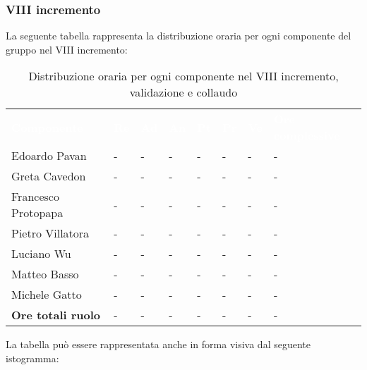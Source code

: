 \subsubsection{VIII incremento}
La seguente tabella rappresenta la distribuzione oraria per ogni componente del gruppo nel VIII incremento:
\begin{table}[!htbp]
\begin{center}
\renewcommand{\arraystretch}{1.25}
\begin{tabular}{ m{}<{\centering}  m{}<{\centering} m{}<{\centering} m{}<{\centering}  m{}<{\centering}  m{}<{\centering}  m{}<{\centering}  m{}<{\centering}   }
	\rowcolor{darkblue}
	\textcolor{white}{\textbf{Componente}} &\textcolor{white}{\textbf{Re}}&\textcolor{white}{\textbf{Ad}}&\textcolor{white}{\textbf{An}}&\textcolor{white}{\textbf{Pt}}&\textcolor{white}{\textbf{Pr}}&\textcolor{white}{\textbf{Ve}}&\textcolor{white}{\textbf{Ore complessive}}\\ 

	Edoardo Pavan & - & - & - & - & - & - & -\\	

	\rowcolor{gray!10} Greta Cavedon & - & - & - & - & - & - & -\\
	
	Francesco Protopapa & - & - & - & - & - & - & -\\
	
	\rowcolor{gray!10} Pietro Villatora & - & - & - & - & - & - & -\\
	
	Luciano Wu & - & - & - & - & - & - & -\\
	
	\rowcolor{gray!10} Matteo Basso & - & - & - & - & - & - & -\\
	
	Michele Gatto & - & - & - & - & - & - & -\\
	
	\rowcolor{gray!10} \textbf{Ore totali ruolo} & - & - & - & - & - & - & -\\

\end{tabular}
\caption{Distribuzione oraria per ogni componente nel VIII incremento,  validazione e collaudo}
\end{center}
\end{table}

La tabella può essere rappresentata anche in forma visiva dal seguente istogramma:

